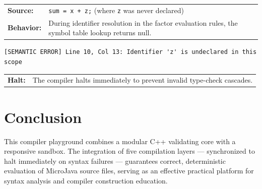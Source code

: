 \documentclass[11pt,a4paper]{article}
\begin{document}
\bigskip
\begin{tcolorbox}[testcase, title={Test Case 5 \quad|\quad Semantic Error — Undeclared Identifier}]
\begin{tabular}{@{}L{2.4cm}L{11cm}@{}}
\textbf{Source:}   & \texttt{sum = x + z;} \quad(where \texttt{z} was never declared) \\[4pt]
\textbf{Behavior:} & During identifier resolution in the factor evaluation rules, the symbol table lookup returns null. \\
\end{tabular}
\medskip
\begin{lstlisting}[style=outputstyle, numbers=none]
[SEMANTIC ERROR] Line 10, Col 13: Identifier 'z' is undeclared in this scope
\end{lstlisting}
\smallskip
\begin{tabular}{@{}L{2.4cm}L{11cm}@{}}
\textbf{Halt:} & The compiler halts immediately to prevent invalid type-check cascades.
\end{tabular}
\end{tcolorbox}

\newpage
\section{Conclusion}

This compiler playground combines a modular C++ validating core with a responsive sandbox. The integration of five compilation layers — synchronized to halt immediately on syntax failures — guarantees correct, deterministic evaluation of MicroJava source files, serving as an effective practical platform for syntax analysis and compiler construction education.
\end{document}
